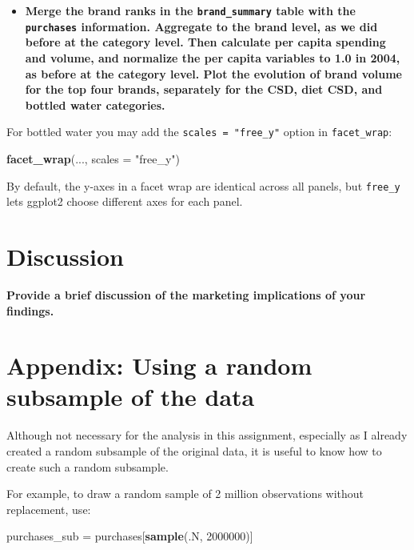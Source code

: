 \documentclass[
]{article}
\newenvironment{Shaded}{\begin{snugshade}}{\end{snugshade}}
\newcommand{\AttributeTok}[1]{\textcolor[rgb]{0.13,0.29,0.53}{#1}}
\newcommand{\DecValTok}[1]{\textcolor[rgb]{0.00,0.00,0.81}{#1}}
\newcommand{\FunctionTok}[1]{\textcolor[rgb]{0.13,0.29,0.53}{\textbf{#1}}}
\newcommand{\NormalTok}[1]{#1}
\newcommand{\OtherTok}[1]{\textcolor[rgb]{0.56,0.35,0.01}{#1}}
\newcommand{\StringTok}[1]{\textcolor[rgb]{0.31,0.60,0.02}{#1}}
\providecommand{\tightlist}{%
  \setlength{\itemsep}{0pt}\setlength{\parskip}{0pt}}
\begin{document}
\begin{itemize}
\tightlist
\item
  \textbf{Merge the brand ranks in the \texttt{brand\_summary} table
  with the \texttt{purchases} information. Aggregate to the brand level,
  as we did before at the category level. Then calculate per capita
  spending and volume, and normalize the per capita variables to 1.0 in
  2004, as before at the category level. Plot the evolution of brand
  volume for the top four brands, separately for the CSD, diet CSD, and
  bottled water categories.}
\end{itemize}

For bottled water you may add the \texttt{scales\ =\ "free\_y"} option
in \texttt{facet\_wrap}:

\begin{Shaded}
\begin{Highlighting}[]
   \FunctionTok{facet\_wrap}\NormalTok{(..., }\AttributeTok{scales =} \StringTok{"free\_y"}\NormalTok{)}
\end{Highlighting}
\end{Shaded}

By default, the y-axes in a facet wrap are identical across all panels,
but \texttt{free\_y} lets ggplot2 choose different axes for each panel.

\section{Discussion}\label{discussion}

\textbf{Provide a brief discussion of the marketing implications of your
findings.}

\newpage

\section{Appendix: Using a random subsample of the
data}\label{appendix-using-a-random-subsample-of-the-data}

Although not necessary for the analysis in this assignment, especially
as I already created a random subsample of the original data, it is
useful to know how to create such a random subsample.

For example, to draw a random sample of 2 million observations without
replacement, use:

\begin{Shaded}
\begin{Highlighting}[]
\NormalTok{purchases\_sub }\OtherTok{=}\NormalTok{ purchases[}\FunctionTok{sample}\NormalTok{(.N, }\DecValTok{2000000}\NormalTok{)]}
\end{Highlighting}
\end{Shaded}
\end{document}
